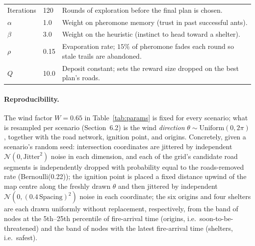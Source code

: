 \documentclass[11pt,a4paper]{article}
\begin{document}
\begin{table}[H]
\begin{tabular}{@{}llp{7.6cm}@{}}
Iterations       & 120            & Rounds of exploration before the final plan is chosen. \\
$\alpha$         & 1.0            & Weight on pheromone memory (trust in past successful ants). \\
$\beta$          & 3.0            & Weight on the heuristic (instinct to head toward a shelter). \\
$\rho$           & 0.15           & Evaporation rate; $15\%$ of pheromone fades each round so stale trails are abandoned. \\
$Q$              & 10.0           & Deposit constant; sets the reward size dropped on the best plan's roads. \\
\bottomrule
\end{tabular}
\end{table}

\paragraph{Reproducibility.} The wind factor $W=0.65$ in Table~\ref{tab:params} is fixed for every scenario; what is resampled per scenario (Section~6.2) is the wind \emph{direction} $\theta \sim \mathrm{Uniform}(0, 2\pi)$, together with the road network, ignition point, and origins. Concretely, given a scenario's random seed: intersection coordinates are jittered by independent $\mathcal{N}(0, \text{Jitter}^2)$ noise in each dimension, and each of the grid's candidate road segments is independently dropped with probability equal to the roads-removed rate (Bernoulli(0.22)); the ignition point is placed a fixed distance upwind of the map centre along the freshly drawn $\theta$ and then jittered by independent $\mathcal{N}(0, (0.4\,\text{Spacing})^2)$ noise in each coordinate; the six origins and four shelters are each drawn uniformly without replacement, respectively, from the band of nodes at the 5th--25th percentile of fire-arrival time (origins, i.e.\ soon-to-be-threatened) and the band of nodes with the latest fire-arrival time (shelters, i.e.\ safest).
\end{document}
